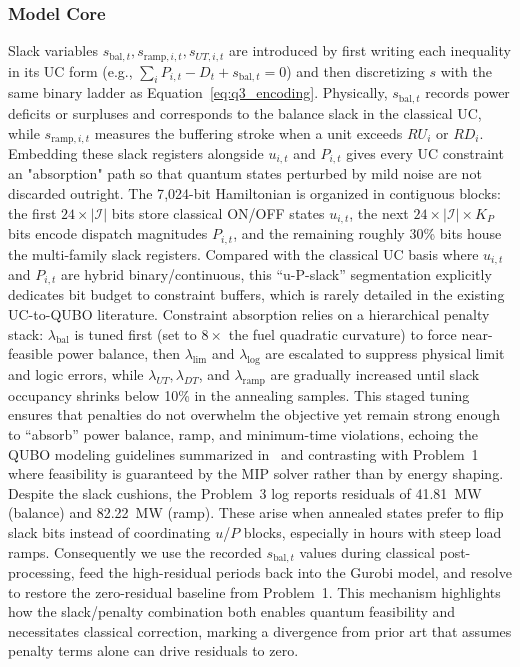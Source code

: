 \documentclass{apmcmthesis}
\begin{document}
\subsubsection*{Model Core}
Slack variables $s_{\text{bal},t}, s_{\text{ramp},i,t}, s_{UT,i,t}$ are introduced by first writing each inequality in its UC form (e.g., $\sum_i P_{i,t}-D_t + s_{\text{bal},t}=0$) and then discretizing $s$ with the same binary ladder as Equation~\eqref{eq:q3_encoding}. Physically, $s_{\text{bal},t}$ records power deficits or surpluses and corresponds to the balance slack in the classical UC, while $s_{\text{ramp},i,t}$ measures the buffering stroke when a unit exceeds $RU_i$ or $RD_i$. Embedding these slack registers alongside $u_{i,t}$ and $P_{i,t}$ gives every UC constraint an "absorption" path so that quantum states perturbed by mild noise are not discarded outright.
The 7{,}024-bit Hamiltonian is organized in contiguous blocks: the first $24\times |\mathcal{I}|$ bits store classical ON/OFF states $u_{i,t}$, the next $24\times |\mathcal{I}|\times K_P$ bits encode dispatch magnitudes $P_{i,t}$, and the remaining roughly 30\% bits house the multi-family slack registers. Compared with the classical UC basis where $u_{i,t}$ and $P_{i,t}$ are hybrid binary/continuous, this ``u-P-slack'' segmentation explicitly dedicates bit budget to constraint buffers, which is rarely detailed in the existing UC-to-QUBO literature.
Constraint absorption relies on a hierarchical penalty stack: $\lambda_{\text{bal}}$ is tuned first (set to $8\times$ the fuel quadratic curvature) to force near-feasible power balance, then $\lambda_{\text{lim}}$ and $\lambda_{\text{log}}$ are escalated to suppress physical limit and logic errors, while $\lambda_{UT}, \lambda_{DT}$, and $\lambda_{\text{ramp}}$ are gradually increased until slack occupancy shrinks below 10\% in the annealing samples. This staged tuning ensures that penalties do not overwhelm the objective yet remain strong enough to ``absorb'' power balance, ramp, and minimum-time violations, echoing the QUBO modeling guidelines summarized in~\cite{glover2018} and contrasting with Problem~1 where feasibility is guaranteed by the MIP solver rather than by energy shaping.
Despite the slack cushions, the Problem~3 log reports residuals of 41.81~MW (balance) and 82.22~MW (ramp). These arise when annealed states prefer to flip slack bits instead of coordinating $u$/$P$ blocks, especially in hours with steep load ramps. Consequently we use the recorded $s_{\text{bal},t}$ values during classical post-processing, feed the high-residual periods back into the Gurobi model, and resolve to restore the zero-residual baseline from Problem~1. This mechanism highlights how the slack/penalty combination both enables quantum feasibility and necessitates classical correction, marking a divergence from prior art that assumes penalty terms alone can drive residuals to zero.
\end{document}
